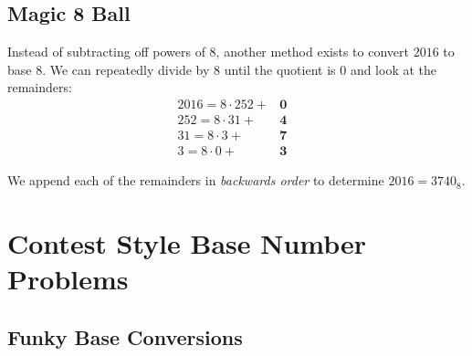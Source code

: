 \clearpage  

\subsection{Magic 8 Ball}

Instead of subtracting off powers of $8$, another method exists to convert $2016$ to base $8$. We can repeatedly divide by $8$ until the quotient is $0$ and look at the remainders: \begin{eqnarray*}  2016=8\cdot 252+&\textbf{0}& \\ 252=8\cdot 31+&\textbf{4}& \\ 31=8\cdot 3+&\textbf{7}& \\ 3=8\cdot 0+&\textbf{3}& \end{eqnarray*}

We append each of the remainders in \textit{backwards order} to determine $2016=3740_8$.

\clearpage

\section{Contest Style Base Number Problems}  


\subsection{Funky Base Conversions}


